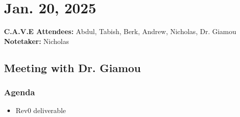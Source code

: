 	\pagebreak
	\section*{Jan. 20, 2025}

	\textbf{C.A.V.E Attendees:} Abdul, Tabish, Berk, Andrew, Nicholas, Dr. Giamou\\
	\textbf{Notetaker:} Nicholas

	\subsection*{Meeting with Dr. Giamou}
		\subsubsection*{Agenda}
			\begin{itemize}
				\item Rev0 deliverable
			\end{itemize}

